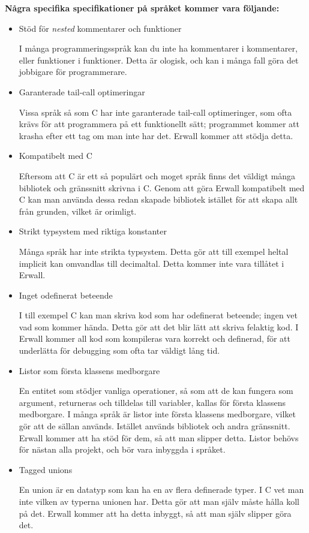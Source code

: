\documentclass{theme}
\begin{document}
\noindent \textbf{Några specifika specifikationer på språket kommer vara 
följande:}

\begin{itemize}
	\item Stöd för \textit{nested} kommentarer och funktioner

		I många programmeringsspråk kan du inte ha kommentarer i kommentarer, 
		eller funktioner i funktioner. Detta är ologisk, och kan i många fall
		göra det jobbigare för programmerare. 

	\item Garanterade tail-call optimeringar

		Vissa språk så som C har inte garanterade tail-call optimeringer, som 
		ofta krävs för att programmera på ett funktionellt sätt; programmet 
		kommer att krasha efter ett tag om man inte har det. Erwall kommer 
		att stödja detta.

	\item Kompatibelt med C 

		Eftersom att C är ett så populärt och moget språk finns det väldigt 
		många bibliotek och gränssnitt skrivna i C. Genom att göra Erwall 
		kompatibelt med C kan man använda dessa redan skapade bibliotek istället
		för att skapa allt från grunden, vilket är orimligt.

	\item Strikt typsystem med riktiga konstanter

		Många språk har inte strikta typsystem. Detta gör att till exempel 
		heltal implicit kan omvandlas till decimaltal. Detta kommer inte vara 
		tillåtet i Erwall.

	\item Inget odefinerat beteende

		I till exempel C kan man skriva kod som har odefinerat beteende; ingen 
		vet vad som kommer hända. Detta gör att det blir lätt att skriva 
		felaktig kod. I Erwall kommer all kod som kompileras vara korrekt och 
		definerad, för att underlätta för debugging som ofta tar väldigt lång 
		tid.

	\item Listor som första klassens medborgare

		En entitet som stödjer vanliga operationer, så som att de kan fungera 
		som argument, returneras och tilldelas till variabler, kallas för första
		klassens medborgare. I många språk är listor inte första klassens
		medborgare, vilket gör att de sällan används. Istället används bibliotek
		och andra gränssnitt. Erwall kommer att ha stöd för dem, så att man 
		slipper detta. Listor behövs för nästan alla projekt, och bör vara 
		inbyggda i språket. 

	\item Tagged unions

		En union är en datatyp som kan ha en av flera definerade typer. I C
		vet man inte vilken av typerna unionen har. Detta gör att man själv
		måste hålla koll på det. Erwall kommer att ha detta inbyggt, så att 
		man själv slipper göra det.

\end{itemize}
\end{document}

